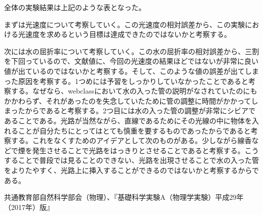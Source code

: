 \documentclass{jsarticle}
\begin{document}
全体の実験結果は上記のような表となった。\\
\par まずは光速度について考察していく。この光速度の相対誤差から、この実験における光速度を求めるという目標は達成できたのではないかと考察する。
\par 次には水の屈折率について考察していく。この水の屈折率の相対誤差から、三割を下回っているので、文献値に、今回の光速度の結果ほどではないが非常に良い値が出ているのではないかと考察する。そして、このような値の誤差が出てしまった原因を考察する。1つめには予習をしっかりしていなかったことであると考察する。なぜなら、webclassにおいて水の入った管の説明がなされていたのにもかかわらず、それがあったのを失念していたために管の調整に時間がかかってしまったからであると考察する。2つ目には水の入った管の調整が非常にシビアであることである。光路が当然ながら、直線であるためにその光線の中に物体を入れることが自分たちにとってはとても慎重を要するものであったからであると考察する。これをなくすためのアイデアとして次のものがある。少しながら線香などで煙を発生させることで光路をはっきりとさせることであると考察する。こうすることで普段では見ることのできない、光路を出現させることで水の入った管をよりたやすく、光路上に挿入することができるのではないかと考察するからである。



\begin{thebibliography}{99}
     共通教育部自然科学部会（物理）、『基礎科学実験A（物理学実験）平成29年（2017年）版』
\end{thebibliography}
\end{document}
